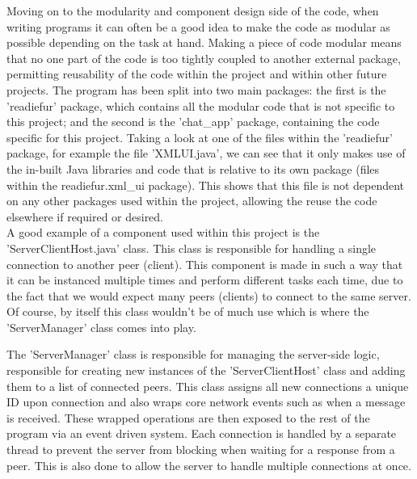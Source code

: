 \documentclass{COMPXXXX}
\begin{document}
\normalsize \textrm {Moving on to the modularity and component design side of the code, when writing programs it can often be a good idea to make the code as modular as possible depending on the task at hand. Making a piece of code modular means that no one part of the code is too tightly coupled to another external package, permitting  reusability of the code within the project and within other future projects.
The program has been split into two main packages: the first is the 'readiefur' package, which contains all the modular code that is not specific to this project; and the second is the 'chat\_app' package, containing the code specific for this project. Taking a look at one of the files within the 'readiefur' package, for example the file 'XMLUI.java', we can see that it only makes use of the in-built Java libraries and code that is relative to its own package (files within the readiefur.xml\_ui package). This shows that this file is not dependent on any other packages used within the project, allowing the reuse the code elsewhere if required or desired.\\
A good example of a component used within this project is the 'ServerClientHost.java' class. This class is responsible for handling a single connection to another peer (client). This component is made in such a way that it can be instanced multiple times and perform different tasks each time, due to the fact that we would expect many peers (clients) to connect to the same server. Of course, by itself this class wouldn't be of much use which is where the 'ServerManager' class comes into play.}

\normalsize \textrm {The 'ServerManager' class is responsible for managing the server-side logic, responsible for creating new instances of the 'ServerClientHost' class and adding them to a list of connected peers. This class assigns all new connections a unique ID upon connection and also wraps core network events such as when a message is received. These wrapped operations are then exposed to the rest of the program via an event driven system. Each connection is handled by a separate thread to prevent the server from blocking when waiting for a response from a peer. This is also done to allow the server to handle multiple connections at once.}
\end{document}
